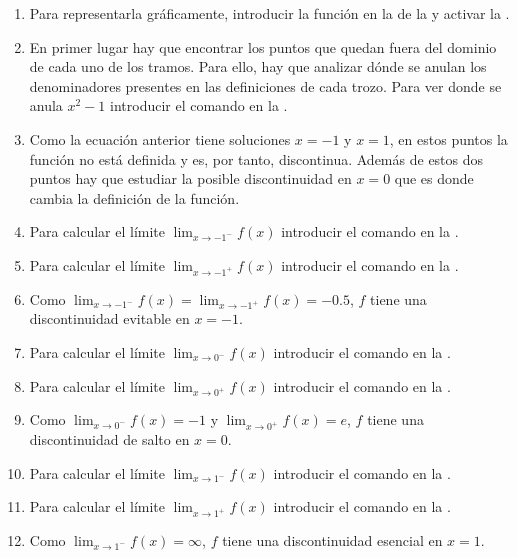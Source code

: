 \begin{enumerate}[leftmargin=*]
      \begin{indication}
      \begin{enumerate}
      \item Para representarla gráficamente, introducir la función  en la  de la  y activar la .
      \item En primer lugar hay que encontrar los puntos que quedan fuera del dominio de cada uno de los tramos.
            Para ello, hay que analizar dónde se anulan los denominadores presentes en las definiciones de cada trozo.
            Para ver donde se anula $x^2-1$ introducir el comando  en la .
      \item Como la ecuación anterior tiene soluciones $x=-1$ y $x=1$, en estos puntos la función no está definida y es, por tanto, discontinua.
            Además de estos dos puntos hay que estudiar la posible discontinuidad en $x=0$ que es donde cambia la definición de la función.
      \item Para calcular el límite $\lim_{x\rightarrow -1^-}f(x)$ introducir el comando  en la .
      \item Para calcular el límite $\lim_{x\rightarrow -1^+}f(x)$ introducir el comando  en la .
      \item Como $\lim_{x\rightarrow -1^-}f(x)=\lim_{x\rightarrow -1^+}f(x)=-0.5$, $f$ tiene una discontinuidad evitable en $x=-1$.
      \item Para calcular el límite $\lim_{x\rightarrow 0^-}f(x)$ introducir el comando  en la .
      \item Para calcular el límite $\lim_{x\rightarrow 0^+}f(x)$ introducir el comando  en la .
      \item Como $\lim_{x\rightarrow 0^-}f(x)=-1$ y $\lim_{x\rightarrow 0^+}f(x)=e$, $f$ tiene una discontinuidad de salto en $x=0$.
      \item Para calcular el límite $\lim_{x\rightarrow 1^-}f(x)$ introducir el comando  en la .
      \item Para calcular el límite $\lim_{x\rightarrow 1^+}f(x)$ introducir el comando  en la .
      \item Como $\lim_{x\rightarrow 1^-}f(x)=\infty$, $f$ tiene una discontinuidad esencial en $x=1$.
      \end{enumerate}
      \end{indication}
\end{enumerate}


